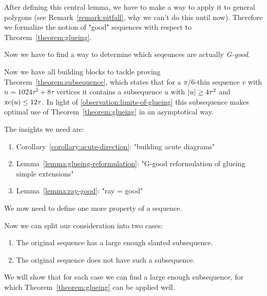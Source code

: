 After defining this central lemma, we have to make a way to apply it to general polygons (see Remark~\ref{remark:pitfall}, why we can't do this until now).
Therefore we formalize the notion of "good" sequences with respect to Theorem~\ref{theorem:glueing}.

\begin{definition}[G-envelope]
\end{definition}

\begin{definition}[G-good]
\end{definition}

\begin{lemma}\label{lemma:glueing-reformulation}
\end{lemma}

Now we have to find a way to determine which seqeunces are actually \emph{G-good}.
\begin{lemma}\label{lemma:ray-good}
\end{lemma}

Now we have all building blocks to tackle proving Theorem~\ref{theorem:subsequence}, which states that for a $\pi/6$-thin sequence $v$ with $n = 1024\tau^3 + 8\tau$ vertices it contains a subsequence $u$ with $\lvert u\rvert \geq 4\tau^2$ and $\operatorname{xc}(u) \leq 12\tau$. In light of \ref{observation:limits-of-glueing} this subsequence makes optimal use of Theorem~\ref{theorem:glueing} in an asymptotical way.

The insights we need are: %
\begin{enumerate}
  \item Corollary~\ref{corollary:acute-direction}: "building acute diagrams"
  \item Lemma~\ref{lemma:glueing-reformulation}: "G-good reformulation of glueing simple extensions"
  \item Lemma~\ref{lemma:ray-good}: "ray = good"
\end{enumerate}

We now need to define one more property of a sequence.

\begin{definition}
\end{definition}

Now we can split our consideration into two cases:
\begin{enumerate}
  \item The original sequence has a large enough slanted subsequence.
  \item The original sequence does not have such a subsequence.
\end{enumerate}
We will show that for each case we can find a large enough subsequence, for which Theorem~\ref{theorem:glueing} can be applied well.

